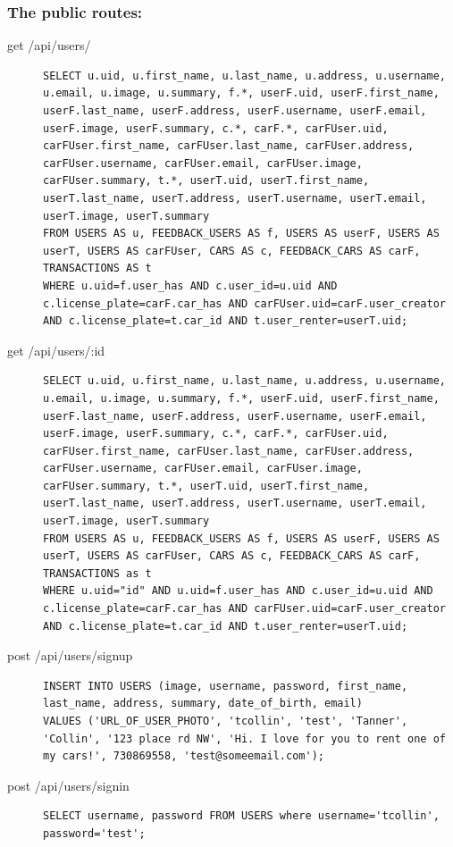 \documentclass{article}
\begin{document}
\subsubsection{The public routes:}
\begin{description}
\item[get /api/users/] \mbox{}
\begin{lstlisting}[style=sql]
SELECT u.uid, u.first_name, u.last_name, u.address, u.username, u.email, u.image, u.summary, f.*, userF.uid, userF.first_name, userF.last_name, userF.address, userF.username, userF.email, userF.image, userF.summary, c.*, carF.*, carFUser.uid, carFUser.first_name, carFUser.last_name, carFUser.address, carFUser.username, carFUser.email, carFUser.image, carFUser.summary, t.*, userT.uid, userT.first_name, userT.last_name, userT.address, userT.username, userT.email, userT.image, userT.summary
FROM USERS AS u, FEEDBACK_USERS AS f, USERS AS userF, USERS AS userT, USERS AS carFUser, CARS AS c, FEEDBACK_CARS AS carF, TRANSACTIONS AS t
WHERE u.uid=f.user_has AND c.user_id=u.uid AND c.license_plate=carF.car_has AND carFUser.uid=carF.user_creator AND c.license_plate=t.car_id AND t.user_renter=userT.uid;
\end{lstlisting}


\item[get /api/users/:id] \mbox{}
\begin{lstlisting}[style=sql]
SELECT u.uid, u.first_name, u.last_name, u.address, u.username, u.email, u.image, u.summary, f.*, userF.uid, userF.first_name, userF.last_name, userF.address, userF.username, userF.email, userF.image, userF.summary, c.*, carF.*, carFUser.uid, carFUser.first_name, carFUser.last_name, carFUser.address, carFUser.username, carFUser.email, carFUser.image, carFUser.summary, t.*, userT.uid, userT.first_name, userT.last_name, userT.address, userT.username, userT.email, userT.image, userT.summary
FROM USERS AS u, FEEDBACK_USERS AS f, USERS AS userF, USERS AS userT, USERS AS carFUser, CARS AS c, FEEDBACK_CARS AS carF, TRANSACTIONS as t
WHERE u.uid="id" AND u.uid=f.user_has AND c.user_id=u.uid AND c.license_plate=carF.car_has AND carFUser.uid=carF.user_creator AND c.license_plate=t.car_id AND t.user_renter=userT.uid;

\end{lstlisting}

\item[post /api/users/signup] \mbox{}
\begin{lstlisting}[style=sql]
INSERT INTO USERS (image, username, password, first_name, last_name, address, summary, date_of_birth, email)
VALUES ('URL_OF_USER_PHOTO', 'tcollin', 'test', 'Tanner', 'Collin', '123 place rd NW', 'Hi. I love for you to rent one of my cars!', 730869558, 'test@someemail.com');
\end{lstlisting}

\item[post /api/users/signin] \mbox{}
\begin{lstlisting}[style=sql]
SELECT username, password FROM USERS where username='tcollin', password='test';
\end{lstlisting}
\end{description}
\end{document}
